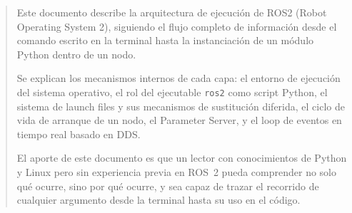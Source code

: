 \begin{abstract}
Este documento describe la arquitectura de ejecución de ROS2 (Robot Operating System 2), siguiendo el flujo completo de información desde el comando escrito en la terminal hasta la instanciación de un módulo Python dentro de un nodo.

Se explican los mecanismos internos de cada capa: el entorno de ejecución del sistema operativo, el rol del ejecutable \texttt{ros2} como script Python, el sistema de launch files y sus mecanismos de sustitución diferida, el ciclo de vida de arranque de un nodo, el Parameter Server, y el loop de eventos en tiempo real basado en DDS. 

El aporte de este documento es que un lector con conocimientos de Python y Linux pero sin experiencia previa en ROS~2 pueda comprender no solo qué ocurre, sino por qué ocurre, y sea capaz de trazar el recorrido de cualquier argumento desde la terminal hasta su uso en el código.
\end{abstract}
